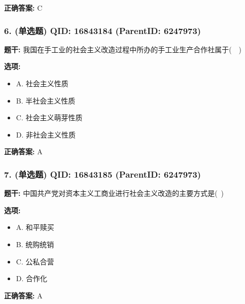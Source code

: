 \documentclass[12pt,UTF8]{ctexart}
\begin{document}
\textbf{正确答案:}
C

\vspace{0.3em}\hrulefill\vspace{0.7em}

\subsubsection*{6. (单选题) \small QID: 16843184 (ParentID: 6247973)}

\textbf{题干:}
我国在手工业的社会主义改造过程中所办的手工业生产合作社属于(  )



\textbf{选项:}
\begin{itemize}[leftmargin=*]

  \item A. 社会主义性质

  \item B. 半社会主义性质

  \item C. 社会主义萌芽性质

  \item D. 非社会主义性质

\end{itemize}

\textbf{正确答案:}
A

\vspace{0.3em}\hrulefill\vspace{0.7em}

\subsubsection*{7. (单选题) \small QID: 16843185 (ParentID: 6247973)}

\textbf{题干:}
中国共产党对资本主义工商业进行社会主义改造的主要方式是( )



\textbf{选项:}
\begin{itemize}[leftmargin=*]

  \item A. 和平赎买

  \item B. 统购统销

  \item C. 公私合营

  \item D. 合作化

\end{itemize}

\textbf{正确答案:}
A
\end{document}
